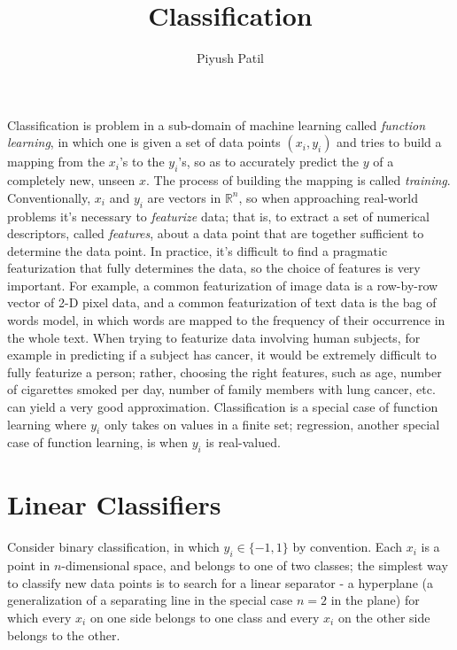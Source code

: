 \documentclass{article}
\begin{document}
\title{Classification}
\author{Piyush Patil}
\maketitle

Classification is problem in a sub-domain of machine learning called \textit{function learning}, in which one is given a set of data points $ (x_i, y_i) $ and tries to build a mapping from the $ x_i $'s to the $ y_i $'s, so as to accurately predict the $ y $ of a completely new, unseen $ x $. The process of building the mapping is called \textit{training}.
\newline \newline
Conventionally, $ x_i $ and $ y_i $ are vectors in $ \mathbb{R}^n $, so when approaching real-world problems it's necessary to \textit{featurize} data; that is, to extract a set of numerical descriptors, called \textit{features}, about a data point that are together sufficient to determine the data point. In practice, it's difficult to find a pragmatic featurization that fully determines the data, so the choice of features is very important.
\newline \newline
For example, a common featurization of image data is a row-by-row vector of 2-D pixel data, and a common featurization of text data is the bag of words model, in which words are mapped to the frequency of their occurrence in the whole text. When trying to featurize data involving human subjects, for example in predicting if a subject has cancer, it would be extremely difficult to fully featurize a person; rather, choosing the right features, such as age, number of cigarettes smoked per day, number of family members with lung cancer, etc. can yield a very good approximation.
\newline \newline
Classification is a special case of function learning where $ y_i $ only takes on values in a finite set; regression, another special case of function learning, is when $ y_i $ is real-valued.

\section{Linear Classifiers}
Consider binary classification, in which $ y_i \in \{-1, 1\} $ by convention. Each $ x_i $ is a point in $ n $-dimensional space, and belongs to one of two classes; the simplest way to classify new data points is to search for a linear separator - a hyperplane (a generalization of a separating line in the special case $ n = 2 $ in the plane) for which every $ x_i $ on one side belongs to one class and every $ x_i $ on the other side belongs to the other.
\end{document}
